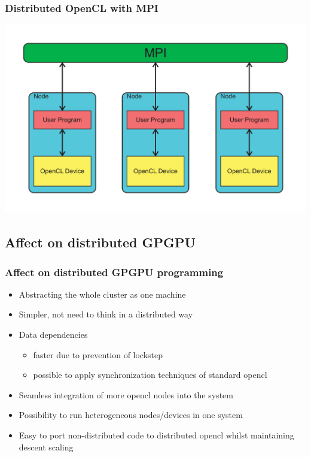 \documentclass{beamer}
\begin{document}
\begin{frame}
    \frametitle{Distributed OpenCL with MPI}
    \includegraphics[width=\textwidth]{../2014-09-25_gputalk/mpi_opencl.pdf}
\end{frame}



\subsection{Affect on distributed GPGPU}

\begin{frame}
    \frametitle{Affect on distributed GPGPU programming}
    \begin{itemize}
        \item Abstracting the whole cluster as one machine
        \item Simpler, not need to think in a distributed way
        \item Data dependencies
        \begin{itemize}
            \item faster due to prevention of lockstep
            \item possible to apply synchronization techniques of standard opencl
        \end{itemize}
        \item Seamless integration of more opencl nodes into the system
        \item Possibility to run heterogeneous nodes/devices in one system
        \item Easy to port non-distributed code to distributed opencl whilst
              maintaining descent scaling
    \end{itemize}
\end{frame}
\end{document}
